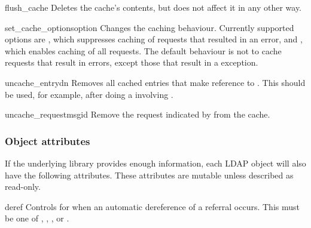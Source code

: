 
\begin{methoddesc}[LDAP]{flush_cache}{}
Deletes the cache's contents, but does not affect it in any other way.
\end{methoddesc}


\begin{methoddesc}[LDAP]{set_cache_options}{option}
Changes the caching behaviour. Currently supported options are
    , which suppresses caching of requests
    	that resulted in an error, and
    , which enables caching of all requests.
The default behaviour is not to cache requests that result in errors, except 
those that result in a  exception.
\end{methoddesc}


\begin{methoddesc}[LDAP]{uncache_entry}{dn}
Removes all cached entries that make reference to . This should be
used, for example, after doing a  involving .
\end{methoddesc}


\begin{methoddesc}[LDAP]{uncache_request}{msgid}
Remove the request indicated by  from the cache.
\end{methoddesc}


\subsubsection{Object attributes}

If the underlying library provides enough information,
each LDAP object will also have the following attributes.
These attributes are mutable unless described as read-only.


\begin{memberdesc}[LDAP]{deref} %
    Controls for when an automatic dereference of a referral occurs.
    This must be one of
    , , ,
    or .
\end{memberdesc}

